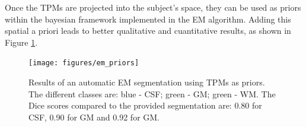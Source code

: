 

Once the TPMs are projected into the subject's space, they can be used as priors within the bayesian framework implemented in the EM algorithm. Adding this spatial a priori leads to better qualitative and cuantitative results, as shown in Figure \ref{fig:em-priors}.

\begin{figure}
  \centering
  \texttt{[image: figures/em\_priors]}
  \caption{Results of an automatic EM segmentation using TPMs as priors. The different classes are: blue - CSF; green - GM; green - WM. The Dice scores compared to the provided segmentation are: 0.80 for CSF, 0.90 for GM and 0.92 for GM.}
  \label{fig:em-priors}
\end{figure}










